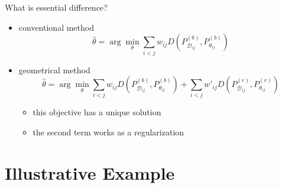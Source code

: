 \documentclass[fleqn,aspectratio=1610]{beamer}
\begin{document}
\begin{frame}[label={sec:org82052a7}]{What is essential difference?}
\begin{itemize}
\item conventional method
\begin{equation}
  \hat\theta
  =\arg\min_{\theta}
  \sum_{i<j} w_{ij}D(P_{\mathcal{D}_{ij}}^{(b)},P_{\theta_{ij}}^{(b)})
\end{equation}
\item geometrical method
\begin{equation}
  \hat\theta
  =\arg\min_{\theta}
  \sum_{i<j}w_{ij}D(P_{\mathcal{D}_{ij}}^{(b)},P_{\theta_{ij}}^{(b)})
  +\sum_{i<j}w'_{ij}D(P_{\mathcal{D}_{ij}}^{(r)},P_{\theta_{ij}}^{(r)})
\end{equation}
\begin{itemize}
\item this objective has a unique solution
\item the second term works as a regularization
\end{itemize}
\end{itemize}
\end{frame}


\section{Illustrative Example}
\label{sec:orgaccb373}
\end{document}
